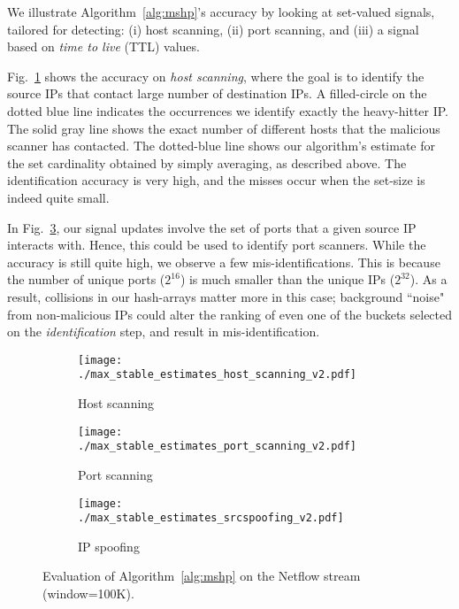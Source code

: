 \documentclass[10pt, conference, letterpaper,onecolumn]{IEEEtranv1.8}
\theoremstyle{plain}\newtheorem{thm}{Theorem}\newtheorem{lem}{Lemma}
\theoremstyle{definition}
\begin{document}
\smallskip
{}
We illustrate Algorithm~\ref{alg:mshp}'s accuracy by looking at set-valued signals, tailored for detecting: 
(i) host scanning, (ii) port scanning, and (iii) a signal based on \emph{time to live} (TTL) values. 


Fig.~\ref{fig:max_sketch_eval} shows the accuracy on {\em host scanning}, 
where the goal is to identify the source IPs that contact large number of destination IPs.  
A filled-circle on the dotted blue line indicates the occurrences we identify 
exactly the heavy-hitter IP. The solid gray line shows the exact number of different hosts that the malicious scanner has contacted. The dotted-blue
line shows our algorithm's estimate for the set cardinality obtained by simply averaging, as described above.
The identification accuracy
is very high, and the misses occur when the set-size is indeed quite small. 

In Fig.~\ref{fig:max_sketch_eval_ports}, our signal updates involve the set of ports that a given source IP interacts with.
Hence, this could be used to identify port scanners. While the accuracy is still quite high,
we observe a few mis-identifications. This is because the number of unique ports ($2^{16}$) is much smaller than the unique IPs ($2^{32}$).
As a result, collisions in our hash-arrays matter more in this case; background ``noise" from
non-malicious IPs could alter the ranking of even one of the buckets selected on the \emph{identification} step, and result in mis-identification.

\begin{figure*}[t]
        \centering
        \begin{subfigure}[b]{0.3\textwidth}
              \texttt{[image: ./max\_stable\_estimates\_host\_scanning\_v2.pdf]}
                \caption{\footnotesize Host scanning}
                \label{fig:max_sketch_eval}
        \end{subfigure}
        \begin{subfigure}[b]{0.3\textwidth}
                \texttt{[image: ./max\_stable\_estimates\_port\_scanning\_v2.pdf]}
                \caption{\footnotesize Port scanning}
                \label{fig:max_sketch_eval_ports}
        \end{subfigure}                
        \begin{subfigure}[b]{0.3\textwidth}
                \texttt{[image: ./max\_stable\_estimates\_srcspoofing\_v2.pdf]}
                \caption{\footnotesize IP spoofing}
                \label{fig:max_sketch_eval_ports}
        \end{subfigure}
         \caption{\footnotesize Evaluation of Algorithm~\ref{alg:mshp} on the Netflow stream (window=100K).}
          \label{fig:max_stable_case_studies}
\end{figure*}
\end{document}
